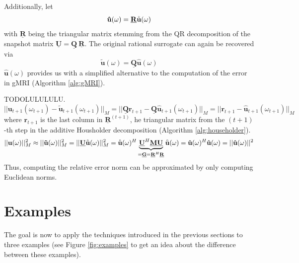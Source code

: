 \documentclass[11pt, a4paper]{article}
\begin{document}
Additionally, let
\begin{equation}
    \mathbf{\hat{u}}(\omega) = \mathbf{\underline{R}} \accentset{\circ}{\mathbf{u}}(\omega) \label{equ:u-hat}
\end{equation}
with $\mathbf{\underline{R}}$ being the triangular matrix stemming from the QR decomposition 
of the snapshot matrix $\mathbf{\underline{U}} = \mathbf{\underline{Q}} ~ \mathbf{\underline{R}}$.
The original rational surrogate can again be recovered via
\begin{equation}
    \mathbf{\tilde{u}}(\omega) = \mathbf{\underline{Q}} \mathbf{\hat{u}}(\omega)
\end{equation}
$\mathbf{\hat{u}}(\omega)$ provides us with a simplified alternative to the
computation of the error in \acrshort{gMRI} (Algorithm \ref{alg:gMRI}).

TODOLULULULU.
\begin{equation}
    ||\mathbf{u}_{t+1}(\omega_{t+1}) - \mathbf{\tilde{u}}_{t+1}(\omega_{t+1})||_M
    = ||\mathbf{\underline{Q}} \mathbf{r}_{t+1} - \mathbf{\underline{Q}}\mathbf{\hat{u}}_{t+1}(\omega_{t+1})||_M
    = ||\mathbf{r}_{t+1} - \mathbf{\hat{u}}_{t+1}(\omega_{t+1})||_M
\end{equation}
where $\mathbf{r}_{t+1}$ is the last column in $\mathbf{\underline{R}}^{(t+1)}$,
he triangular matrix from the $(t+1)$-th step in the additive Housholder decomposition
(Algorithm \ref{alg:householder}).
\begin{equation}
    ||\mathbf{u}(\omega)||_M^2 \approx ||\mathbf{\tilde{u}}(\omega)||_M^2
    = ||\mathbf{\underline{U}} \accentset{\circ}{\mathbf{u}}(\omega)||_M^2
    = \accentset{\circ}{\mathbf{u}}(\omega)^H \underbrace{\mathbf{\underline{U}}^H \mathbf{\underline{M}} \mathbf{\underline{U}}}_{= \mathbf{\underline{G}} = \mathbf{\underline{R}}^H \mathbf{\underline{R}}} \accentset{\circ}{\mathbf{u}}(\omega)
    = \mathbf{\hat{u}}(\omega)^H \mathbf{\hat{u}}(\omega)
    = ||\mathbf{\hat{u}}(\omega)||^2
\end{equation}
Thus, computing the relative error norm can be approximated by only computing
Euclidean norms.

\newpage
\section{Examples}
\label{sec:examples}

The goal is now to apply the techniques introduced in the previous sections
to three examples (see Figure \ref{fig:examples} to get an idea about the
difference between these examples).
\end{document}
